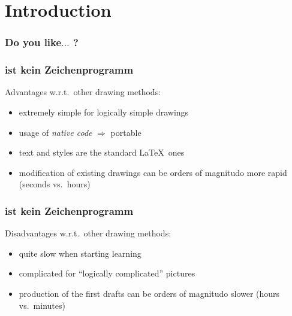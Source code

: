 \section{Introduction}




\begin{frame}
    \frametitle{Do you like$\ldots$ ?}
    
\end{frame}








\begin{frame}
    \frametitle{\Tikz ist kein Zeichenprogramm}
    \begin{center}
    \end{center}
    {
        \alert{Advantages w.r.t.\ other drawing methods:}
        \begin{itemize}
            \item extremely simple for logically simple drawings
            \item usage of \emph{native code} $\Rightarrow$ portable
            \item text and styles are the standard \LaTeX\ ones
            \item modification of existing drawings can be \alert{orders of magnitudo} more rapid (seconds vs.\ hours)
        \end{itemize}
    }
\end{frame}





\begin{frame}
    \frametitle{\Tikz ist kein Zeichenprogramm}
    \begin{center}
    \end{center}
    {
        \alert{Disadvantages w.r.t.\ other drawing methods:}
        \begin{itemize}
            \item quite slow when starting learning
            \item complicated for ``logically complicated'' pictures
            \item production of the first drafts can be \alert{orders of magnitudo} slower (hours vs.\ minutes)
        \end{itemize}
    }
\end{frame}





